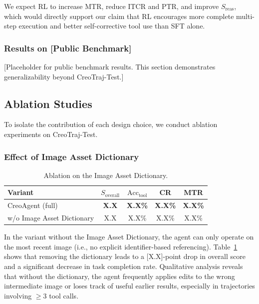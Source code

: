 \documentclass{article}
\begin{document}
We expect RL to increase MTR, reduce ITCR and PTR, and improve $S_{\text{reas}}$, which would directly support our claim that RL encourages more complete multi-step execution and better self-corrective tool use than SFT alone.

\subsubsection{Results on [Public Benchmark]}

[Placeholder for public benchmark results. This section demonstrates generalizability beyond CreoTraj-Test.]

\subsection{Ablation Studies}

To isolate the contribution of each design choice, we conduct ablation experiments on CreoTraj-Test.

\subsubsection{Effect of Image Asset Dictionary}

\begin{table}[t]
\centering
\caption{Ablation on the Image Asset Dictionary.}
\label{tab:ablation_dict}
\begin{tabular}{lcccc}
\toprule
\textbf{Variant} & $S_{\text{overall}}$ & $\text{Acc}_{\text{tool}}$ & CR & MTR \\
\midrule
CreoAgent (full) & \textbf{X.X} & \textbf{X.X\%} & \textbf{X.X\%} & \textbf{X.X\%} \\
w/o Image Asset Dictionary & X.X & X.X\% & X.X\% & X.X\% \\
\bottomrule
\end{tabular}
\end{table}



In the variant without the Image Asset Dictionary, the agent can only operate on the most recent image (i.e., no explicit identifier-based referencing). Table~\ref{tab:ablation_dict} shows that removing the dictionary leads to a [X.X]-point drop in overall score and a significant decrease in task completion rate. Qualitative analysis reveals that without the dictionary, the agent frequently applies edits to the wrong intermediate image or loses track of useful earlier results, especially in trajectories involving $\geq$3 tool calls.
\end{document}
